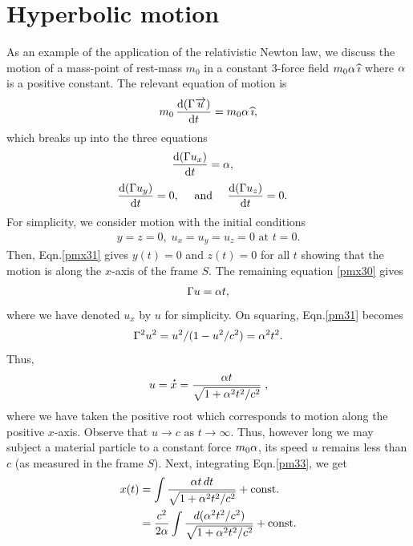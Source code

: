 \vspace{-.2cm}

\section{Hyperbolic motion}
As an example of the application of the relativistic 
Newton 
law, we discuss the motion of a mass-point of 
rest-mass 
$m_0$ in a constant 3-force field $m_0 {\alpha}\,{\widehat{\imath}}$ 
where 
${\alpha}$ is a {positive} constant. The relevant equation 
of 
motion is 
\begin{align}\label{pm29} 
m_0\,\frac{\mathrm{d}{(\Gamma \overrightarrow{u})}}{\mathrm{d}{t}}=m_0 {\alpha}\,{\widehat{\imath}}, 
\end{align} 
which breaks up into the three equations
\begin{align}\label{pmx30}
\frac{\mathrm{d}{(\Gamma u_x)}}{\mathrm{d}{t}}& = {\alpha}, 
\end{align}
\begin{align}
\frac{\mathrm{d}{(\Gamma u_y)}}{\mathrm{d}{t}}& =0,\quad\text{ and }\quad
\frac{\mathrm{d}{(\Gamma u_z)}}{\mathrm{d}{t}} =0.\label{pmx31}
\end{align}
For simplicity, we consider motion with the initial 
conditions
\begin{align}\label{pm30}
y =z=0,\; u_x=u_y=u_z=0  \text{ at }  t=0.
\end{align}
Then, Eqn.\eqref{pmx31} gives $y(t) =0$ and $ z(t) =0$ 
for 
all $t$ showing that the motion is along the $x$-axis 
of the 
frame $S$. The remaining equation \eqref{pmx30} gives
\begin{align}\label{pm31}
\Gamma u = {\alpha} t,
\end{align}
where we have denoted $u_x$ by $u$ for simplicity. On
squaring,  Eqn.\eqref{pm31} becomes
\begin{align}\label{pm32}
\Gamma^2 u^2=u^2/(1-u^2/c^2)=  {\alpha} ^2 t ^2.
\end{align}
Thus,
\begin{align}\label{pm33}
u={\overset{\hspace*{1.5pt}\centerdot}{x} }=\frac{{\alpha} t}{\sqrt{1+{\alpha}^2 t^2/c^2}}\;,
\end{align}
where we have taken the positive root  which 
corresponds to 
motion along the positive $x$-axis. Observe that 
$u\rightarrow c \text{ as } t \rightarrow \infty$. 
Thus, 
{however long we may subject a material particle to a 
constant force $m_0 {\alpha}$, its speed $u$ remains less 
than 
$c$} (as measured in the frame $S$). Next, integrating 
Eqn.\eqref{pm33}, we get
\begin{align*}
x(t)&= \int \frac{{\alpha} t
\,dt}{\sqrt{1+{\alpha}^2 t^2/c^2}}+\text{const.}\notag\\&=
\frac{c^2}{2{\alpha}}\int
 \frac{d({\alpha}^2
t^2/c^2)}{\sqrt{1+{\alpha}^2t^2/c^2}}+\text{const}.
\end{align*}
